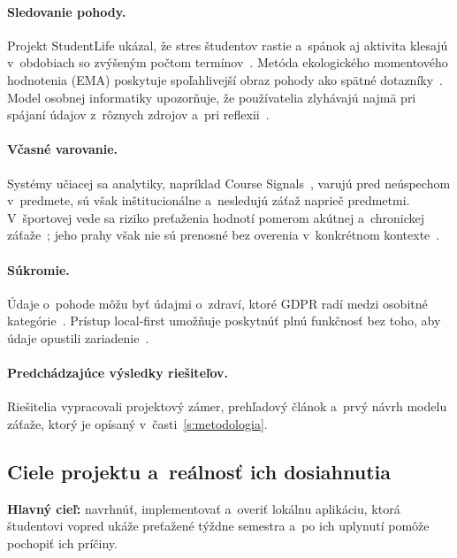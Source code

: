 \documentclass[11pt,a4paper]{article}
\begin{document}
\paragraph{Sledovanie pohody.}
Projekt StudentLife ukázal, že stres študentov rastie a~spánok aj aktivita
klesajú v~obdobiach so zvýšeným počtom termínov~\cite{Wang:StudentLife}.
Metóda ekologického momentového hodnotenia (EMA) poskytuje spoľahlivejší
obraz pohody ako spätné dotazníky~\cite{Shiffman:EMA}. Model osobnej
informatiky upozorňuje, že používatelia zlyhávajú najmä pri spájaní údajov
z~rôznych zdrojov a~pri reflexii~\cite{Li:PersonalInformatics}.

\paragraph{Včasné varovanie.}
Systémy učiacej sa analytiky, napríklad Course
Signals~\cite{Arnold:CourseSignals}, varujú pred neúspechom v~predmete, sú
však inštitucionálne a~nesledujú záťaž naprieč predmetmi. V~športovej vede sa
riziko preťaženia hodnotí pomerom akútnej a~chronickej
záťaže~\cite{Gabbett:ACWR}; jeho prahy však nie sú prenosné bez overenia
v~konkrétnom kontexte~\cite{Impellizzeri:ACWR}.

\paragraph{Súkromie.}
Údaje o~pohode môžu byť údajmi o~zdraví, ktoré GDPR radí medzi osobitné
kategórie~\cite{GDPR,Zakon18}. Prístup local-first umožňuje poskytnúť plnú
funkčnosť bez toho, aby údaje opustili zariadenie~\cite{Kleppmann:LocalFirst}.

\paragraph{Predchádzajúce výsledky riešiteľov.}
Riešitelia vypracovali projektový zámer, prehľadový článok a~prvý návrh
modelu záťaže, ktorý je opísaný v~časti~\ref{s:metodologia}.

\subsection{Ciele projektu a~reálnosť ich dosiahnutia}

\textbf{Hlavný cieľ:} navrhnúť, implementovať a~overiť lokálnu aplikáciu,
ktorá študentovi vopred ukáže preťažené týždne semestra a~po ich uplynutí
pomôže pochopiť ich príčiny.
\end{document}

